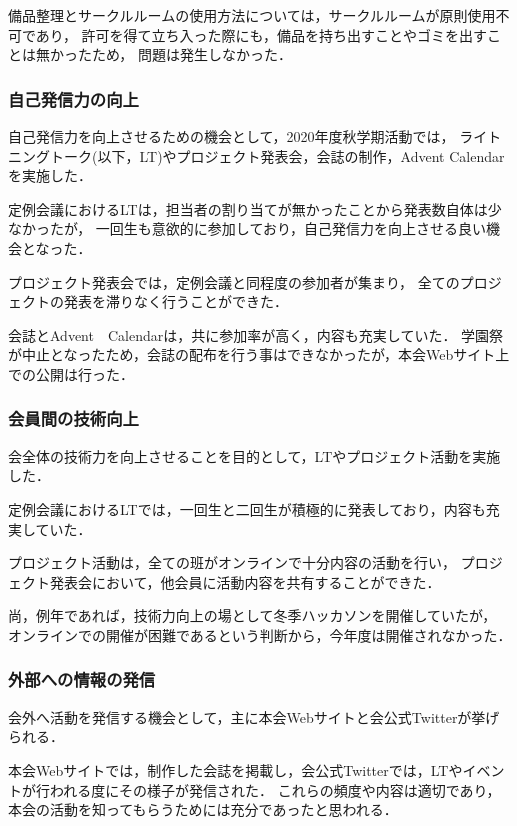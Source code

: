     備品整理とサークルルームの使用方法については，サークルルームが原則使用不可であり，
    許可を得て立ち入った際にも，備品を持ち出すことやゴミを出すことは無かったため，
    問題は発生しなかった．

\subsubsection*{自己発信力の向上}
    自己発信力を向上させるための機会として，2020年度秋学期活動では，
    ライトニングトーク(以下，LT)やプロジェクト発表会，会誌の制作，Advent Calendarを実施した．

    定例会議におけるLTは，担当者の割り当てが無かったことから発表数自体は少なかったが，
    一回生も意欲的に参加しており，自己発信力を向上させる良い機会となった．

    プロジェクト発表会では，定例会議と同程度の参加者が集まり，
    全てのプロジェクトの発表を滞りなく行うことができた．

    会誌とAdvent　Calendarは，共に参加率が高く，内容も充実していた．
    学園祭が中止となったため，会誌の配布を行う事はできなかったが，本会Webサイト上での公開は行った．

\subsubsection*{会員間の技術向上}
    会全体の技術力を向上させることを目的として，LTやプロジェクト活動を実施した．

    定例会議におけるLTでは，一回生と二回生が積極的に発表しており，内容も充実していた．

    プロジェクト活動は，全ての班がオンラインで十分内容の活動を行い，
    プロジェクト発表会において，他会員に活動内容を共有することができた．

    尚，例年であれば，技術力向上の場として冬季ハッカソンを開催していたが，
    オンラインでの開催が困難であるという判断から，今年度は開催されなかった．

\subsubsection*{外部への情報の発信}
    会外へ活動を発信する機会として，主に本会Webサイトと会公式Twitterが挙げられる．

    本会Webサイトでは，制作した会誌を掲載し，会公式Twitterでは，LTやイベントが行われる度にその様子が発信された．
    これらの頻度や内容は適切であり，本会の活動を知ってもらうためには充分であったと思われる．
